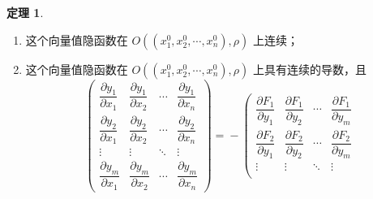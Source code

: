 \documentclass[zihao=-4,linespread=1.8,UTF8,nothm]{aytony_base}
\theoremstyle{definition}
\newtheorem{theorem}{\indent\heiti\textbf{定理}}[subsection]
\begin{document}
\begin{theorem}
\begin{enumerate}[nosep]
$$\begin{matrix}
                          f_1({x}_1, {x}_2, \cdots, {x}_{n}) \\
                          f_2({x}_1, {x}_2, \cdots, {x}_{n}) \\
                          \vdots                             \\
                          f_m({x}_1, {x}_2, \cdots, {x}_{n}) \\
                      \end{matrix}
                  \right),\quad ({x}_1, {x}_2, \cdots, {x}_{n}) \in O((x^0_1, x^0_2, \cdots, x^0_{n}), \rho)\ ,
              $$ 它满足 $$
                  F_i({x}_1, {x}_2, \cdots, {x}_{n}, {f}_1({x}_1, {x}_2, \cdots, {x}_{n}), {f}_2({x}_1, {x}_2, \cdots, {x}_{n}), \cdots, {f}_m({x}_1, {x}_2, \cdots, {x}_{n})) = 0\ ,
              $$ 以及 $y_i^0 = f_i(x^0_1, x^0_2, \cdots, x^0_{n})(i = 1, 2, \cdots, m)$；
        \item 这个向量值隐函数在 $O((x^0_1, x^0_2, \cdots, x^0_{n}), \rho)$ 上连续；
        \item 这个向量值隐函数在 $O((x^0_1, x^0_2, \cdots, x^0_{n}), \rho)$ 上具有连续的导数，且 $$
                  \left(
                  \begin{matrix}
                          \dfrac{\partial y_1}{\partial x_1} & \dfrac{\partial y_1}{\partial x_2} & \cdots & \dfrac{\partial y_1}{\partial x_n} \\
                          \dfrac{\partial y_2}{\partial x_1} & \dfrac{\partial y_2}{\partial x_2} & \cdots & \dfrac{\partial y_2}{\partial x_n} \\
                          \vdots                             & \vdots                             & \ddots & \vdots                             \\
                          \dfrac{\partial y_m}{\partial x_1} & \dfrac{\partial y_m}{\partial x_2} & \cdots & \dfrac{\partial y_m}{\partial x_n}
                      \end{matrix}
                  \right)\! =\! -\! \left(
                  \begin{matrix}
                      \dfrac{\partial F_1}{\partial y_1} & \dfrac{\partial F_1}{\partial y_2} & \cdots & \dfrac{\partial F_1}{\partial y_m} \\
                      \dfrac{\partial F_2}{\partial y_1} & \dfrac{\partial F_2}{\partial y_2} & \cdots & \dfrac{\partial F_2}{\partial y_m} \\
                      \vdots                             & \vdots                             & \ddots & \vdots                             \\

\end{matrix}$$
\end{enumerate}
\end{theorem}
\end{document}
